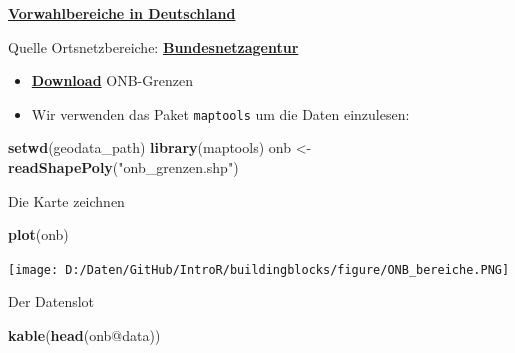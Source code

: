 \documentclass[ignorenonframetext,]{beamer}
\newenvironment{Shaded}{\begin{snugshade}}{\end{snugshade}}
\newcommand{\KeywordTok}[1]{\textcolor[rgb]{0.26,0.66,0.93}{\textbf{#1}}}
\newcommand{\StringTok}[1]{\textcolor[rgb]{0.02,0.61,0.04}{#1}}
\newcommand{\OperatorTok}[1]{\textcolor[rgb]{0.74,0.68,0.62}{#1}}
\newcommand{\NormalTok}[1]{\textcolor[rgb]{0.74,0.68,0.62}{#1}}
\begin{document}
\begin{frame}[fragile]{\href{http://www.bundesnetzagentur.de/SharedDocs/Downloads/DE/Sachgebiete/Telekommunikation/Unternehmen_Institutionen/Nummerierung/Rufnummern/ONVerzeichnisse/ONBGrenzen/ONB_Grenzen.html}{\textbf{Vorwahlbereiche
in Deutschland}}}

\begin{block}{Quelle Ortsnetzbereiche:
\href{https://www.bundesnetzagentur.de/DE/Sachgebiete/Telekommunikation/Unternehmen_Institutionen/Nummerierung/Rufnummern/ONRufnr/ON_Einteilung_ONB/ON_ONB_ONKz_ONBGrenzen_Basepage.html}{\textbf{Bundesnetzagentur}}}

\begin{itemize}
\item
  \href{https://www.bundesnetzagentur.de/SharedDocs/Downloads/DE/Sachgebiete/Telekommunikation/Unternehmen_Institutionen/Nummerierung/Rufnummern/ONVerzeichnisse/ONBGrenzen/ONB-Grenzen-2018.zip?__blob=publicationFile\&v=21}{\textbf{Download}}
  ONB-Grenzen
\item
  Wir verwenden das Paket \texttt{maptools} um die Daten einzulesen:
\end{itemize}

\begin{Shaded}
\begin{Highlighting}[]
\KeywordTok{setwd}\NormalTok{(geodata_path)}
\KeywordTok{library}\NormalTok{(maptools)}
\NormalTok{onb <-}\StringTok{ }\KeywordTok{readShapePoly}\NormalTok{(}\StringTok{"onb_grenzen.shp"}\NormalTok{)}
\end{Highlighting}
\end{Shaded}

\end{block}

\end{frame}

\begin{frame}[fragile]{Die Karte zeichnen}

\begin{Shaded}
\begin{Highlighting}[]
\KeywordTok{plot}\NormalTok{(onb)}
\end{Highlighting}
\end{Shaded}

\texttt{[image: D:/Daten/GitHub/IntroR/buildingblocks/figure/ONB\_bereiche.PNG]}

\end{frame}

\begin{frame}[fragile]{Der Datenslot}

\begin{Shaded}
\begin{Highlighting}[]
\KeywordTok{kable}\NormalTok{(}\KeywordTok{head}\NormalTok{(onb}\OperatorTok{@}\NormalTok{data))}
\end{Highlighting}
\end{Shaded}

\end{frame}
\end{document}
